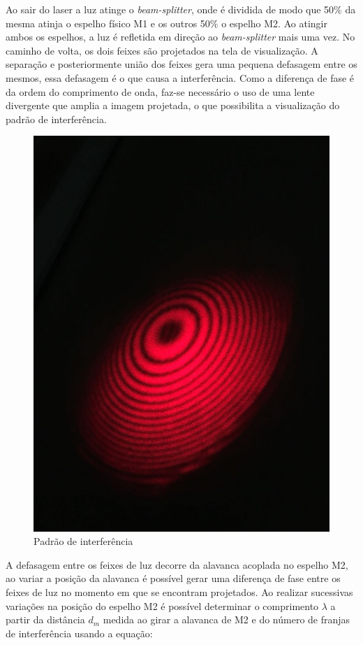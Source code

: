 Ao sair do laser a luz atinge o {\it beam-splitter}, onde é dividida de modo que 50\% da mesma atinja o espelho físico M1 e os outros 50\% o espelho M2. Ao atingir ambos os espelhos, a luz é refletida em direção ao {\it beam-splitter} mais uma vez. No caminho de volta, os dois feixes são projetados na tela de visualização. A separação e posteriormente união dos feixes gera uma pequena defasagem entre os mesmos, essa defasagem é o que causa a interferência. Como a diferença de fase é da ordem do comprimento de onda, faz-se necessário o uso de uma lente divergente que amplia a imagem projetada, o que possibilita a visualização do padrão de interferência.
\begin{figure}[!htb]
	\centering
		\includegraphics[scale= 0.1]{padrao.jpeg}
	\caption{Padrão de interferência}
	\label{im:pad}
\end{figure}

	A defasagem entre os feixes de luz decorre da alavanca acoplada no espelho M2, ao variar a posição da alavanca é possível gerar uma diferença de fase entre os feixes de luz no momento em que se encontram projetados.
	Ao realizar sucessivas variações na posição do espelho M2 é possível determinar o comprimento $\lambda$ a partir da distância $d_{m}$ medida ao girar a alavanca de M2 e do número de franjas de interferência usando a equação:

